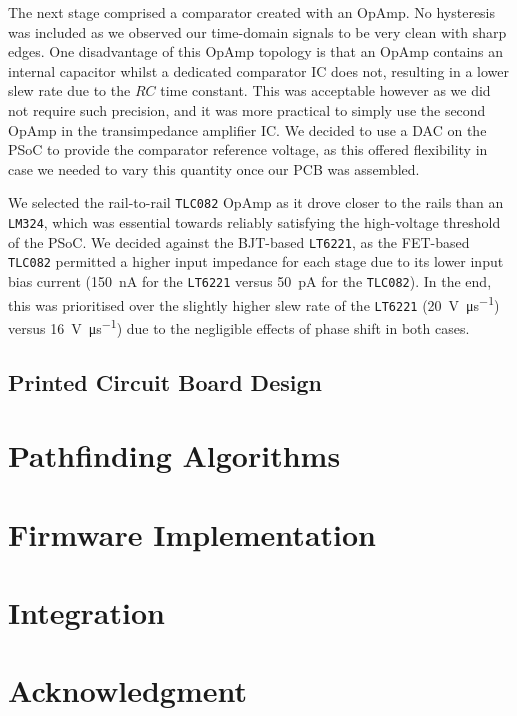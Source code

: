 \documentclass[conference]{IEEEtran}
\begin{document}
The next stage comprised a comparator created with an OpAmp.
No hysteresis was included as we observed our time-domain signals to be very clean with sharp edges.
One disadvantage of this OpAmp topology is that an OpAmp contains an internal capacitor whilst a dedicated comparator IC does not, resulting in a lower slew rate due to the $RC$ time constant.
This was acceptable however as we did not require such precision, and it was more practical to simply use the second OpAmp in the transimpedance amplifier IC.
We decided to use a DAC on the PSoC to provide the comparator reference voltage, as this offered flexibility in case we needed to vary this quantity once our PCB was assembled.

We selected the rail-to-rail \texttt{TLC082} OpAmp as it drove closer to the rails than an \texttt{LM324}, which was essential towards reliably satisfying the high-voltage threshold of the PSoC. We decided against the BJT-based \texttt{LT6221}, as the FET-based \texttt{TLC082} permitted a higher input impedance for each stage due to its lower input bias current (\qty{150}{\nA} for the \texttt{LT6221} versus \qty{50}{\pA} for the \texttt{TLC082}).
In the end, this was prioritised over the slightly higher slew rate of the \texttt{LT6221} (\qty{20}{\volt\per\us}) versus \qty{16}{\volt\per\us}) due to the negligible effects of phase shift in both cases.

\subsection{Printed Circuit Board Design}



\section{Pathfinding Algorithms}



\section{Firmware Implementation}



\section{Integration}



\section*{Acknowledgment}
\end{document}
